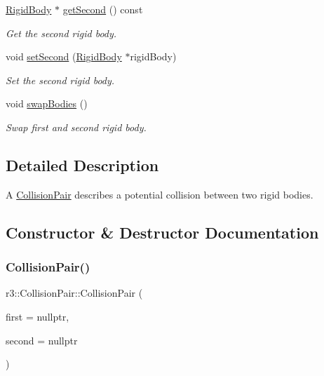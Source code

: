 \begin{DoxyCompactItemize}
\mbox{\hyperlink{classr3_1_1_rigid_body}{Rigid\+Body}} $\ast$ \mbox{\hyperlink{classr3_1_1_collision_pair_a218a4ee7500ed53c3ba5384833afff5a}{get\+Second}} () const
\begin{DoxyCompactList}\small\item\em Get the second rigid body. \end{DoxyCompactList}\item 
void \mbox{\hyperlink{classr3_1_1_collision_pair_a74c24660f8c0e6553494f419c3cf9ae4}{set\+Second}} (\mbox{\hyperlink{classr3_1_1_rigid_body}{Rigid\+Body}} $\ast$rigid\+Body)
\begin{DoxyCompactList}\small\item\em Set the second rigid body. \end{DoxyCompactList}\item 
void \mbox{\hyperlink{classr3_1_1_collision_pair_a8ef5b5bae7be7db3ed2574ecd9e5bf9a}{swap\+Bodies}} ()
\begin{DoxyCompactList}\small\item\em Swap first and second rigid body. \end{DoxyCompactList}\end{DoxyCompactItemize}


\subsection{Detailed Description}
A \mbox{\hyperlink{classr3_1_1_collision_pair}{Collision\+Pair}} describes a potential collision between two rigid bodies. 

\subsection{Constructor \& Destructor Documentation}
\mbox{\label{classr3_1_1_collision_pair_ab6434bde3aa02c2655e26a976570db01}} 
\subsubsection{\texorpdfstring{Collision\+Pair()}{CollisionPair()}}
{\footnotesize\ttfamily r3\+::\+Collision\+Pair\+::\+Collision\+Pair (\begin{DoxyParamCaption}\item[{\mbox{\hyperlink{classr3_1_1_rigid_body}{Rigid\+Body}} $\ast$}]{first = {\ttfamily nullptr},  }\item[{\mbox{\hyperlink{classr3_1_1_rigid_body}{Rigid\+Body}} $\ast$}]{second = {\ttfamily nullptr} }\end{DoxyParamCaption})\hspace{0.3cm}{\ttfamily [explicit]}}



